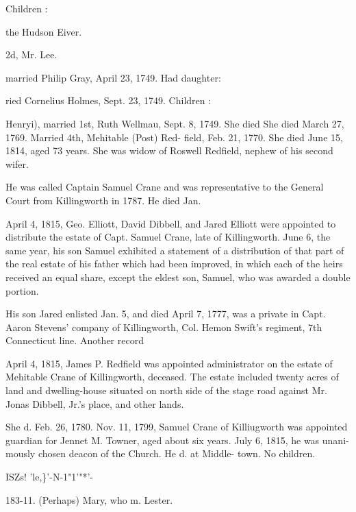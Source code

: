 \documentclass{book}
\begin{document}
Children : 








the Hudson Eiver. 

2d, Mr. Lee. 

married Philip Gray, April 23, 1749. Had daughter: 


ried Cornelius Holmes, Sept. 23, 1749. Children : 






Henryi), married 1st, Ruth Wellmau, Sept. 8, 1749. She died 
She died March 27, 1769. Married 4th, Mehitable (Post) Red- 
field, Feb. 21, 1770. She died June 15, 1814, aged 73 years. 
She was widow of Roswell Redfield, nephew of his second wifer. 

He was called Captain Samuel Crane and was representative 
to the General Court from Killingworth in 1787. He died Jan. 

April 4, 1815, Geo. Elliott, David Dibbell, and Jared Elliott 
were appointed to distribute the estate of Capt. Samuel Crane, 
late of Killingworth. June 6, the same year, his son Samuel 
exhibited a statement of a distribution of that part of the real 
estate of his father which had been improved, in which each of 
the heirs received an equal share, except the eldest son, Samuel, 
who was awarded a double portion. 

His son Jared enlisted Jan. 5, and died April 7, 1777, was a 
private in Capt. Aaron Stevens' company of Killingworth, Col. 
Hemon Swift's regiment, 7th Connecticut line. Another record 

April 4, 1815, James P. Redfield was appointed administrator 
on the estate of Mehitable Crane of Killingworth, deceased. The 
estate included twenty acres of land and dwelling-house situated 
on north side of the stage road against Mr. Jonas Dibbell, Jr.'s 
place, and other lands. 




She d. Feb. 26, 1780. Nov. 11, 1799, Samuel Crane of 
Killiugworth was appointed guardian for Jennet M. 
Towner, aged about six years. July 6, 1815, he was unani- 
mously chosen deacon of the Church. He d. at Middle- 
town. No children. 






ISZs! 'le,\}'-N-1"1'"*'- 



183-11. (Perhaps) Mary, who m. Lester. 
\end{document}
